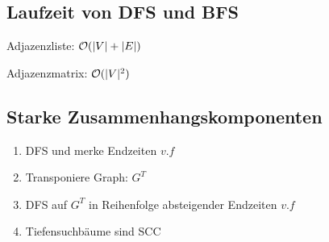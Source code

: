 \subsection*{Laufzeit von DFS und BFS}
Adjazenzliste: $\mathcal{O}(|V|+|E|)$

Adjazenzmatrix: $\mathcal{O}(|V|^2)$

\subsection*{Starke Zusammenhangskomponenten}
\begin{enumerate}
	\item DFS und merke Endzeiten $v.f$
	\item Transponiere Graph: $G^T$
	\item DFS auf $G^T$ in Reihenfolge absteigender Endzeiten $v.f$
	\item Tiefensuchbäume sind SCC
\end{enumerate}
